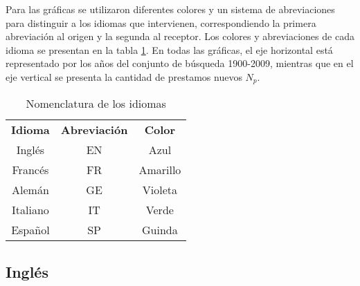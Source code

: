 

Para las gráficas se utilizaron diferentes colores  y un sistema de abreviaciones para distinguir a los idiomas que intervienen, correspondiendo la primera abreviación al origen y la segunda al receptor. Los colores y abreviaciones de cada idioma se presentan  en la tabla \ref{tab.idcolor}. En todas las gráficas, el eje horizontal está representado por los años del conjunto de búsqueda 1900-2009,  mientras que en el eje vertical se presenta la
cantidad de prestamos nuevos $N_{p}$. 


\begin{table} %
	\centering
	\begin{tabular}{ccc}
		\textbf{Idioma} & \textbf{Abreviación} & \textbf{Color} \\
		Inglés          & EN                   & Azul           \\
		Francés         & FR                   & Amarillo       \\
		Alemán          & GE                   & Violeta        \\
		Italiano        & IT                   & Verde          \\
		Español         & SP                   & Guinda        
	\end{tabular}
	\caption{Nomenclatura de los idiomas}
	\label{tab.idcolor}
\end{table} %




	



\subsection{Inglés} %

